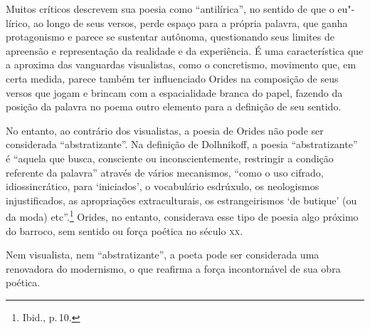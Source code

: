 Muitos críticos descrevem sua poesia como ``antilírica'', no sentido de que o eu"-lírico, ao longo de seus versos, perde espaço para a própria palavra, que ganha protagonismo e parece se sustentar autônoma, questionando seus limites de apreensão e representação da realidade e da experiência. É uma característica que a aproxima das vanguardas visualistas, como o concretismo, movimento que, em certa medida, parece também ter influenciado Orides na composição de seus versos que jogam e brincam com a espacialidade branca do papel, fazendo da posição da palavra no poema outro elemento para a definição de seu sentido.

No entanto, ao contrário dos visualistas, a poesia de Orides não pode ser considerada ``abstratizante''. Na definição de Dolhnikoff, a poesia ``abstratizante'' é ``aquela que busca, consciente ou inconscientemente, restringir a condição referente da palavra'' através de vários mecanismos, ``como o uso cifrado, idiossincrático, para
`iniciados', o vocabulário esdrúxulo, os neologismos injustiﬁcados, as
apropriações extraculturais, os estrangeirismos `de butique' (ou da
moda) etc''.\footnote{Ibid., p.\,10.} Orides, no entanto, considerava esse tipo de poesia algo próximo do barroco, sem sentido ou força poética no século \textsc{xx}.

Nem visualista, nem ``abstratizante'', a poeta pode ser considerada uma renovadora do modernismo, o que reafirma a força incontornável de sua obra poética.